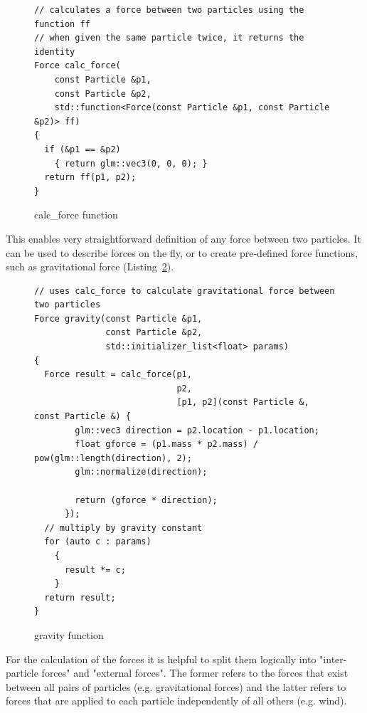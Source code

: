 \documentclass[runningheads,a4paper]{llncs}
\begin{document}
\begin{figure}[tb]
\begin{lstlisting}
// calculates a force between two particles using the function ff
// when given the same particle twice, it returns the identity
Force calc_force(
    const Particle &p1,
    const Particle &p2,
    std::function<Force(const Particle &p1, const Particle &p2)> ff)
{
  if (&p1 == &p2)
    { return glm::vec3(0, 0, 0); }
  return ff(p1, p2);
}                                    
\end{lstlisting}
 \caption{calc\_force function}
 \label{fig:calcforce}
\end{figure}

This enables very straightforward definition of any force between two particles. It can be used to describe forces on the fly, or to create pre-defined force functions, such as gravitational force (Listing~\ref{fig:gravity}).

\begin{figure}[tb]
\begin{lstlisting}
// uses calc_force to calculate gravitational force between two particles
Force gravity(const Particle &p1,
			  const Particle &p2,
              std::initializer_list<float> params)
{
  Force result = calc_force(p1,
  							p2, 
  						    [p1, p2](const Particle &, const Particle &) {
        glm::vec3 direction = p2.location - p1.location;
        float gforce = (p1.mass * p2.mass) / pow(glm::length(direction), 2);
        glm::normalize(direction);

        return (gforce * direction);
      });
  // multiply by gravity constant
  for (auto c : params)
    {
      result *= c;
    }
  return result;
}               
\end{lstlisting}
 \caption{gravity function}
 \label{fig:gravity}
\end{figure}


For the calculation of the forces it is helpful to split them logically into "inter-particle forces" and "external forces". The former refers to the forces that exist between all pairs of particles (e.g. gravitational forces) and the latter refers to forces that are applied to each particle independently of all others (e.g. wind). 
\end{document}
